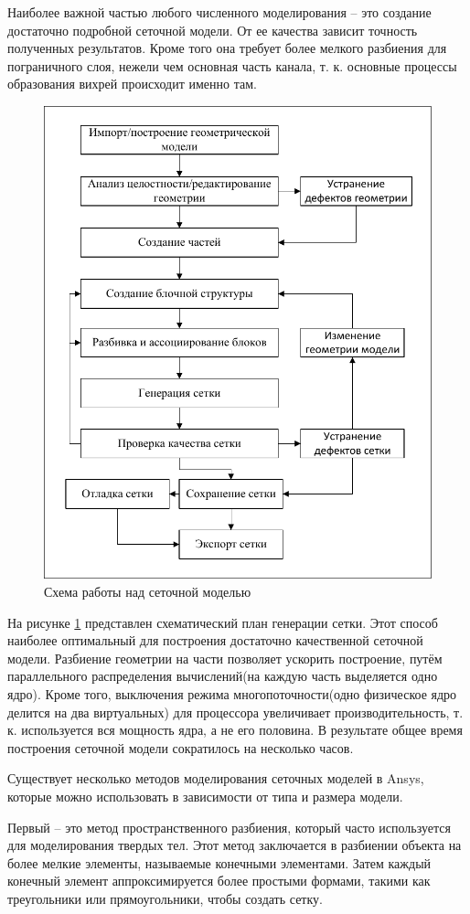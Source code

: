 	Наиболее важной частью любого численного моделирования -- это создание достаточно подробной сеточной модели. От ее качества зависит точность полученных результатов. Кроме того она требует более мелкого разбиения для пограничного слоя, нежели чем основная часть канала, т. к. основные процессы образования вихрей происходит именно там.
	
	\begin{figure}[H]
		\centering
		\includegraphics[width=0.7\linewidth]{../Assets/СхемаСозданияСеткиRU}
		\caption{Схема работы над сеточной моделью}
		\label{fig:meshScheme}
	\end{figure}
	
	На рисунке \ref{fig:meshScheme} представлен схематический план генерации сетки. Этот способ наиболее оптимальный для построения достаточно качественной сеточной модели. Разбиение геометрии на части позволяет ускорить построение, путём параллельного распределения вычислений(на каждую часть выделяется одно ядро). Кроме того, выключения режима многопоточности(одно физическое ядро делится на два виртуальных) для процессора увеличивает производительность, т. к. используется вся мощность ядра, а не его половина. В результате общее время построения сеточной модели сократилось на несколько часов.
	
	Существует несколько методов моделирования сеточных моделей в Ansys, которые можно использовать в зависимости от типа и размера модели.
	
	Первый -- это метод пространственного разбиения, который часто используется для моделирования твердых тел. Этот метод заключается в разбиении объекта на более мелкие элементы, называемые конечными элементами. Затем каждый конечный элемент аппроксимируется более простыми формами, такими как треугольники или прямоугольники, чтобы создать сетку.
	

